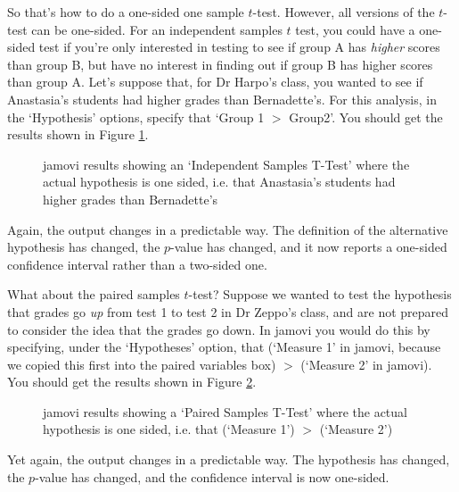 So that's how to do a one-sided one sample $t$-test. However, all versions of the $t$-test can be one-sided. For an independent samples $t$ test, you could have a one-sided test if you're only interested in testing to see if group A has {\it higher} scores than group B, but have no interest in finding out if group B has higher scores than group A. Let's suppose that, for Dr Harpo's class, you wanted to see if Anastasia's students had higher grades than Bernadette's. For this analysis, in the `Hypothesis' options, specify that `Group 1 $>$ Group2'. You should get the results shown in Figure \ref{fig:ttest_onesided2}.

\begin{figure}[htb]
\begin{center}
\caption{jamovi results showing an `Independent Samples T-Test' where the actual hypothesis is one sided, i.e. that Anastasia's students had higher grades than Bernadette's}
\label{fig:ttest_onesided2}
\HR
\end{center}
\end{figure}

Again, the output changes in a predictable way. The definition of the alternative hypothesis has changed, the $p$-value has changed, and it now reports a one-sided confidence interval rather than a two-sided one.

What about the paired samples $t$-test? Suppose we wanted to test the hypothesis that grades go {\it up} from test 1 to test 2 in Dr Zeppo's class, and are not prepared to consider the idea that the grades go down. In jamovi you would do this by specifying, under the `Hypotheses' option, that  (`Measure 1' in jamovi, because we copied this first into the paired variables box) $>$  (`Measure 2' in jamovi). You should get the results shown in Figure \ref{fig:ttest_onesided3}.

\begin{figure}[htb]
\begin{center}
\caption{jamovi results showing a `Paired Samples T-Test' where the actual hypothesis is one sided, i.e. that  (`Measure 1') $>$  (`Measure 2')}
\label{fig:ttest_onesided3}
\HR
\end{center}
\end{figure}

Yet again, the output changes in a predictable way. The hypothesis has changed, the $p$-value has changed, and the confidence interval is now one-sided. 



